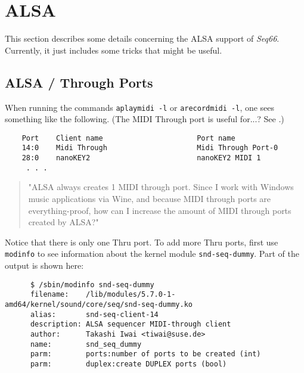 %
%
%

\section{ALSA}
\label{sec:alsa}

   This section describes some details concerning the ALSA support of
   \textsl{Seq66}.
   Currently, it just includes some tricks that might be useful.

\subsection{ALSA / Through Ports}
\label{subsec:alsa_through_ports}

   When running the commands \texttt{aplaymidi -l} or \texttt{arecordmidi -l},
   one sees something like the following.
   (The MIDI Through port is useful for...? See \cite{alsathru}.)

   \begin{verbatim}
    Port    Client name                      Port name
    14:0    Midi Through                     Midi Through Port-0
    28:0    nanoKEY2                         nanoKEY2 MIDI 1
     . . .
   \end{verbatim}

   \begin{quote}
   "ALSA always creates 1 MIDI through port. Since I work with Windows music
   applications via Wine, and because MIDI through ports are everything-proof,
   how can I increase the amount of MIDI through ports created by ALSA?"
   \end{quote}

   Notice that there is only one Thru port.
   To add more Thru ports, first use \texttt{modinfo} to see information about
   the kernel module \texttt{snd-seq-dummy}.  Part of the output is shown here:

   \begin{verbatim}
      $ /sbin/modinfo snd-seq-dummy
      filename:    /lib/modules/5.7.0-1-amd64/kernel/sound/core/seq/snd-seq-dummy.ko
      alias:       snd-seq-client-14
      description: ALSA sequencer MIDI-through client
      author:      Takashi Iwai <tiwai@suse.de>
      name:        snd_seq_dummy
      parm:        ports:number of ports to be created (int)
      parm:        duplex:create DUPLEX ports (bool)
   \end{verbatim}

